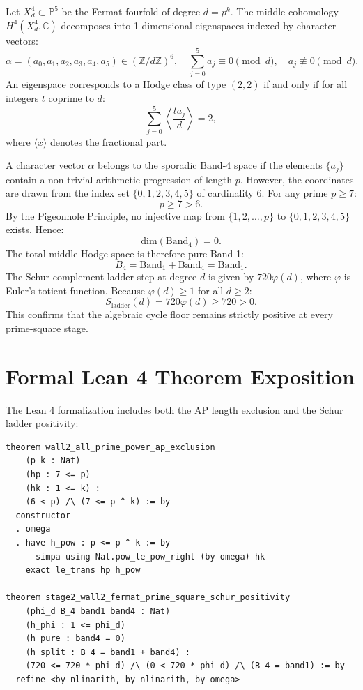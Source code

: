 \documentclass[11pt,a4paper]{article}
\theoremstyle{definition}
\begin{document}
Let $X_d^4 \subset \mathbb{P}^5$ be the Fermat fourfold of degree $d = p^k$. The middle cohomology $H^4(X_d^4, \mathbb{C})$ decomposes into 1-dimensional eigenspaces indexed by character vectors:
\begin{equation}
\alpha = (a_0, a_1, a_2, a_3, a_4, a_5) \in (\mathbb{Z}/d\mathbb{Z})^6, \quad \sum_{j=0}^5 a_j \equiv 0 \pmod d, \quad a_j \not\equiv 0 \pmod d.
\end{equation}
An eigenspace corresponds to a Hodge class of type $(2,2)$ if and only if for all integers $t$ coprime to $d$:
\begin{equation}
\sum_{j=0}^5 \left\langle \frac{t a_j}{d} \right\rangle = 2,
\end{equation}
where $\langle x \rangle$ denotes the fractional part. 

A character vector $\alpha$ belongs to the sporadic Band-4 space if the elements $\{a_j\}$ contain a non-trivial arithmetic progression of length $p$. However, the coordinates are drawn from the index set $\{0, 1, 2, 3, 4, 5\}$ of cardinality 6. For any prime $p \ge 7$:
\begin{equation}
p \ge 7 > 6.
\end{equation}
By the Pigeonhole Principle, no injective map from $\{1, 2, \dots, p\}$ to $\{0, 1, 2, 3, 4, 5\}$ exists. Hence:
\begin{equation}
\mathrm{dim}(\mathrm{Band}_4) = 0.
\end{equation}
The total middle Hodge space is therefore pure Band-1:
\begin{equation}
B_4 = \mathrm{Band}_1 + \mathrm{Band}_4 = \mathrm{Band}_1.
\end{equation}
The Schur complement ladder step at degree $d$ is given by $720 \varphi(d)$, where $\varphi$ is Euler's totient function. Because $\varphi(d) \ge 1$ for all $d \ge 2$:
\begin{equation}
S_{\mathrm{ladder}}(d) = 720 \varphi(d) \ge 720 > 0.
\end{equation}
This confirms that the algebraic cycle floor remains strictly positive at every prime-square stage.


\section{Formal Lean 4 Theorem Exposition}

The Lean 4 formalization includes both the AP length exclusion and the Schur ladder positivity:

\begin{lstlisting}[language=Lean4]
theorem wall2_all_prime_power_ap_exclusion
    (p k : Nat)
    (hp : 7 <= p)
    (hk : 1 <= k) :
    (6 < p) /\ (7 <= p ^ k) := by
  constructor
  . omega
  . have h_pow : p <= p ^ k := by
      simpa using Nat.pow_le_pow_right (by omega) hk
    exact le_trans hp h_pow

theorem stage2_wall2_fermat_prime_square_schur_positivity
    (phi_d B_4 band1 band4 : Nat)
    (h_phi : 1 <= phi_d)
    (h_pure : band4 = 0)
    (h_split : B_4 = band1 + band4) :
    (720 <= 720 * phi_d) /\ (0 < 720 * phi_d) /\ (B_4 = band1) := by
  refine <by nlinarith, by nlinarith, by omega>
\end{lstlisting}
\end{document}
